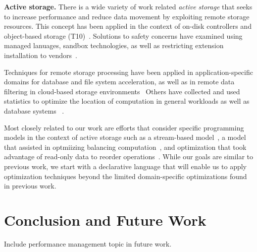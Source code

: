 \documentclass[10pt,twocolumn]{article}
\begin{document}
{\bf Active storage.}
There is a wide variety of work related \emph{active storage} that seeks to
increase performance and reduce data movement by exploiting remote storage
resources. This concept has been applied in the context of on-disk
controllers and object-based storage
(T10)~\cite{riedel:vldb98,du:nwesp05,xie:msst11}.  Solutions to safety
concerns have examined using managed lanuages, sandbox technologies, as well
as restricting extension installation to
vendors~\cite{john:hiperio08,xie:msst11,runde:msst12}.

Techniques for remote storage processing have been applied in
application-specific domains for database and file system acceleration, as
well as in remote data filtering in cloud-based storage
environments~\cite{uysal:hpca00,chiu:iccs03,lim:msst08,gkantsidis:nsdi13}
Others have collected and used statistics to optimize the location of
computation in general workloads as well as database systems
~\cite{chen:cluster12,chen:icpp12,qiao:icde08}.

Most closely related to our work are efforts that consider specific
programming models in the context of active storage such as a stream-based
model~\cite{acharya:asplos98}, a model that assisted in optmiizing balancing
computation~\cite{wickremesinghe:hpdc022}, and optimization that took
advantage of read-only data to reorder operations~\cite{huston:fast04}.
While our goals are similar to previous work, we start with a declarative
language that will enable us to apply optimization techniques beyond
the limited domain-specific optimizations found in previous work.

\section{Conclusion and Future Work}

Include performance management topic in future work.



\end{document}
